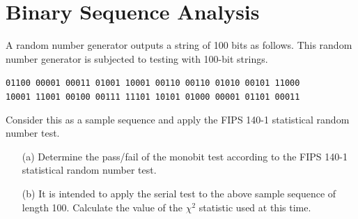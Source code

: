 \documentclass[12pt,openany]{book}
\theoremstyle{definition}
\begin{document}
\section{Binary Sequence Analysis}
A random number generator outputs a string of 100 bits as follows. This random number generator is subjected to testing with 100-bit strings.
\begin{center}
	\texttt{01100 00001 00011 01001 10001 00110 00110 01010 00101 11000}\\
	\texttt{10001 11001 00100 00111 11101 10101 01000 00001 01101 00011}
\end{center}
Consider this as a sample sequence and apply the FIPS 140-1 statistical random number test.
\begin{enumerate}
	\item[(a)] Determine the pass/fail of the monobit test according to the FIPS 140-1 statistical random number test.
	\item[(b)] It is intended to apply the serial test to the above sample sequence of length 100. Calculate the value of the $\chi^2$ statistic used at this time.
\end{enumerate}
\end{document}
